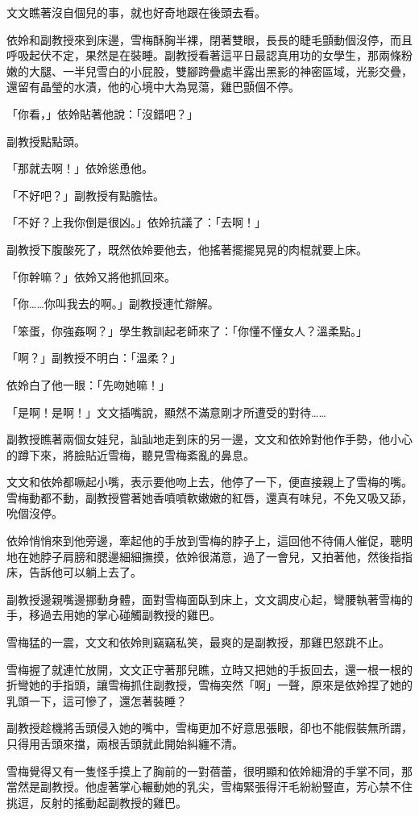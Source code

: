 文文瞧著沒自個兒的事，就也好奇地跟在後頭去看。

依姈和副教授來到床邊，雪梅酥胸半裸，閉著雙眼，長長的睫毛顫動個沒停，而且呼吸起伏不定，果然是在裝睡。副教授看著這平日最認真用功的女學生，那兩條粉嫩的大腿、一半兒雪白的小屁股，雙腳跨疊處半露出黑影的神密區域，光影交疊，還留有晶瑩的水漬，他的心境中大為晃蕩，雞巴顫個不停。

「你看，」依姈貼著他說：「沒錯吧？」

副教授點點頭。

「那就去啊！」依姈慫恿他。

「不好吧？」副教授有點膽怯。

「不好？上我你倒是很凶。」依姈抗議了：「去啊！」

副教授下腹酸死了，既然依姈要他去，他搖著擺擺晃晃的肉棍就要上床。

「你幹嘛？」依姈又將他抓回來。

「你……你叫我去的啊。」副教授連忙辯解。

「笨蛋，你強姦啊？」學生教訓起老師來了：「你懂不懂女人？溫柔點。」

「啊？」副教授不明白：「溫柔？」

依姈白了他一眼：「先吻她嘛！」

「是啊！是啊！」文文插嘴說，顯然不滿意剛才所遭受的對待……

副教授瞧著兩個女娃兒，訕訕地走到床的另一邊，文文和依姈對他作手勢，他小心的蹲下來，將臉貼近雪梅，聽見雪梅紊亂的鼻息。

文文和依姈都噘起小嘴，表示要他吻上去，他停了一下，便直接親上了雪梅的嘴。雪梅動都不動，副教授嘗著她香噴噴軟嫩嫩的紅唇，還真有味兒，不免又吸又舔，吮個沒停。

依姈悄悄來到他旁邊，牽起他的手放到雪梅的脖子上，這回他不待倆人催促，聰明地在她脖子肩膀和腮邊細細撫摸，依姈很滿意，過了一會兒，又拍著他，然後指指床，告訴他可以躺上去了。

副教授邊親嘴邊挪動身體，面對雪梅面臥到床上，文文調皮心起，彎腰執著雪梅的手，移過去用她的掌心碰觸副教授的雞巴。

雪梅猛的一震，文文和依姈則竊竊私笑，最爽的是副教授，那雞巴怒跳不止。

雪梅握了就連忙放開，文文正守著那兒瞧，立時又把她的手扳回去，還一根一根的折彎她的手指頭，讓雪梅抓住副教授，雪梅突然「啊」一聲，原來是依姈捏了她的乳頭一下，這可慘了，還怎著裝睡？

副教授趁機將舌頭侵入她的嘴中，雪梅更加不好意思張眼，卻也不能假裝無所謂，只得用舌頭來擋，兩根舌頭就此開始糾纏不清。

雪梅覺得又有一隻怪手摸上了胸前的一對蓓蕾，很明顯和依姈細滑的手掌不同，那當然是副教授。他虛著掌心輾動她的乳尖，雪梅緊張得汗毛紛紛豎直，芳心禁不住挑逗，反射的搖動起副教授的雞巴。

